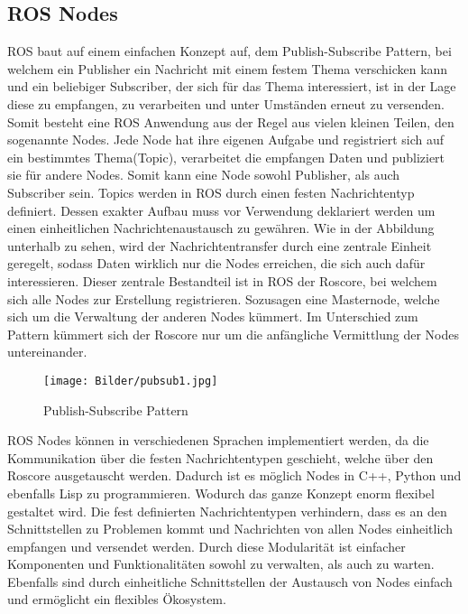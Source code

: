 \subsection{ROS Nodes}
ROS baut auf einem einfachen Konzept auf, dem Publish-Subscribe Pattern, bei welchem ein Publisher ein Nachricht mit einem festem Thema verschicken kann und ein beliebiger Subscriber, der sich für das Thema interessiert, ist in der Lage diese zu empfangen, zu verarbeiten und unter Umständen erneut zu versenden.  Somit besteht eine ROS Anwendung aus der Regel aus vielen kleinen Teilen, den sogenannte Nodes. Jede Node hat ihre eigenen Aufgabe und registriert sich auf ein bestimmtes Thema(Topic), verarbeitet die empfangen Daten und publiziert sie für andere Nodes. Somit kann eine Node sowohl Publisher, als auch Subscriber sein. Topics werden in ROS durch einen festen Nachrichtentyp definiert. Dessen exakter Aufbau muss vor Verwendung deklariert werden um einen einheitlichen Nachrichtenaustausch zu gewähren. Wie in der Abbildung unterhalb zu sehen, wird der Nachrichtentransfer durch eine zentrale Einheit geregelt, sodass Daten wirklich nur die Nodes erreichen, die sich auch dafür interessieren. Dieser zentrale Bestandteil ist in ROS der Roscore, bei welchem sich alle Nodes zur Erstellung registrieren. Sozusagen eine Masternode, welche sich um die Verwaltung der anderen Nodes kümmert. Im Unterschied zum Pattern kümmert sich der Roscore nur um die anfängliche Vermittlung der Nodes untereinander. %
\begin{figure}[ht]
		\centering
	\texttt{[image: Bilder/pubsub1.jpg]}
	\caption[Publish-Subscribe Pattern]{Publish-Subscribe Pattern}

\end{figure}
\newline
ROS Nodes können in verschiedenen Sprachen implementiert werden, da die Kommunikation über die festen Nachrichtentypen geschieht, welche über den Roscore ausgetauscht werden. Dadurch ist es möglich Nodes in C++, Python und ebenfalls Lisp zu programmieren. Wodurch das ganze Konzept enorm flexibel gestaltet wird. Die fest definierten Nachrichtentypen verhindern, dass es an den Schnittstellen zu Problemen kommt und Nachrichten von allen Nodes einheitlich empfangen und versendet werden. \newline
Durch diese Modularität ist einfacher Komponenten und Funktionalitäten sowohl zu verwalten, als auch zu warten. Ebenfalls sind durch einheitliche Schnittstellen der Austausch von Nodes einfach und ermöglicht ein flexibles Ökosystem.

